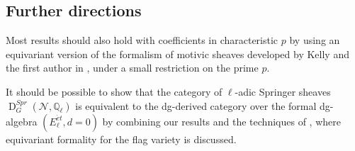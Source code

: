 \documentclass{amsart}
\theoremstyle{plain}
\theoremstyle{TheoremNum}
\theoremstyle{definition}
\theoremstyle{remark}
\numberwithin{equation}{section}
\newcommand{\Q}{\mathbb{Q}}
\newcommand{\N}{\mathcal{N}}
\newcommand{\D}{\operatorname{D}}
\begin{document}
\subsection*{Further directions}
\begin{enumerate*}


\item Most results should also hold with coefficients in characteristic $p$ by using an equivariant version of the formalism of motivic sheaves developed by Kelly and the first author in \cite{eberhardt_mixed_2019}, under a small restriction on the prime $p.$ 
\\
\item It should be possible to show that the category of $\ell$-adic Springer sheaves $\D^{Spr}_G(\N,\Q_\ell)$ is equivalent to the dg-derived category over the formal dg-algebra $(E^{\acute{e}t}_\ell,d=0)$ by combining our results and the techniques of \cite{schnurer_equivariant_2011}, where equivariant formality for the flag variety is discussed.
\end{enumerate*}
\end{document}
